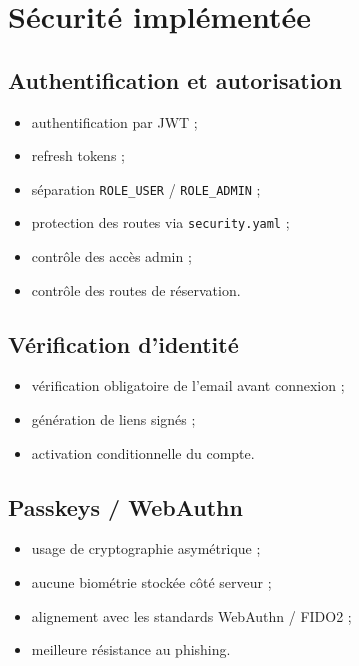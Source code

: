 \documentclass[12pt,a4paper]{report}
\begin{document}
\chapter{Sécurité implémentée}

\section{Authentification et autorisation}

\begin{itemize}[leftmargin=1.2cm]
    \item authentification par JWT ;
    \item refresh tokens ;
    \item séparation \texttt{ROLE\_USER} / \texttt{ROLE\_ADMIN} ;
    \item protection des routes via \texttt{security.yaml} ;
    \item contrôle des accès admin ;
    \item contrôle des routes de réservation.
\end{itemize}

\section{Vérification d'identité}

\begin{itemize}[leftmargin=1.2cm]
    \item vérification obligatoire de l'email avant connexion ;
    \item génération de liens signés ;
    \item activation conditionnelle du compte.
\end{itemize}

\section{Passkeys / WebAuthn}

\begin{itemize}[leftmargin=1.2cm]
    \item usage de cryptographie asymétrique ;
    \item aucune biométrie stockée côté serveur ;
    \item alignement avec les standards WebAuthn / FIDO2 ;
    \item meilleure résistance au phishing.
\end{itemize}
\end{document}
